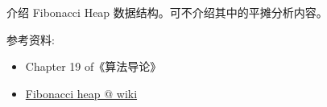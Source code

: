 \documentclass[a4paper, justified]{tufte-handout}
\begin{document}
\begin{ot}
  介绍 Fibonacci Heap 数据结构。可不介绍其中的平摊分析内容。

  \noindent 参考资料:
  \begin{itemize}
    \item Chapter 19 of《算法导论》
    \item \href{https://en.wikipedia.org/wiki/Fibonacci\_heap}{Fibonacci heap @ wiki}
  \end{itemize}
\end{ot}




\beginfb

% 
% 
\end{document}
